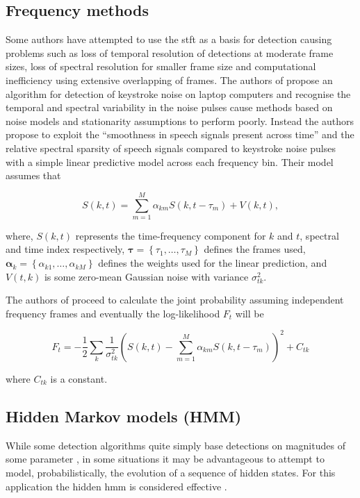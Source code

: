 \subsection{Frequency methods}
 Some authors have attempted to use the \gls{stft} as a basis for detection \cite{Czyzewski1995}\cite{Subramanya2007}\cite{Sugiyama2007}\cite{Abramson2007} causing problems such as loss of temporal resolution of detections at moderate frame sizes, loss of spectral resolution for smaller frame size and computational inefficiency using extensive overlapping of frames. The authors of \cite{Subramanya2007} propose an algorithm for detection of keystroke noise on laptop computers and recognise the temporal and spectral variability in the noise pulses cause methods based on noise models and stationarity assumptions to perform poorly. Instead the authors propose to exploit the ``smoothness in speech signals present across time'' and the relative spectral sparsity of speech signals compared to keystroke noise pulses with a simple linear predictive model across each frequency bin. Their model assumes that

\begin{equation}
\label{eq:Subramanya2007}
S(k,t) = \sum_{m=1}^M \alpha_{km} S(k,t - \tau_m) + V(k,t),
\end{equation}

where, $S(k,t)$ represents the time-frequency component for $k$ and $t$, spectral and time index respectively, $\boldsymbol{\tau} = \left\{\tau_1, \ldots ,\tau_M \right\}$ defines the frames used, \linebreak[2]$\boldsymbol{\alpha}_k = \left\{\alpha_{k1},\ldots,\alpha_{kM} \right\}$ defines the weights used for the linear prediction, and $V(t,k)$ is some zero-mean Gaussian noise with variance $\sigma^2_{tk}$.

The authors of \cite{Subramanya2007} proceed to calculate the joint probability assuming independent frequency frames and eventually the log-likelihood $F_t$ will be

\begin{equation}
\label{eq:Subramanya2007_2}
F_t = - \frac{1}{2} \sum_k \frac{1}{\sigma^2_{tk}} \left( S\left(k,t\right) - \sum_{m=1}^M \alpha_{km} S(k,t-\tau_m)\right)^2 + C_{tk}
\end{equation}

where $C_{tk}$ is a constant.

\subsection{Hidden Markov models (HMM)}
While some detection algorithms quite simply base detections on magnitudes of some parameter \cite{Subramanya2007}\cite{Sugiyama2007}, in some situations it may be advantageous to attempt to model, probabilistically, the evolution of a sequence of hidden states. For this application the hidden \gls{hmm} is considered effective \cite{Rabiner1989}\cite{Xu2005}.


